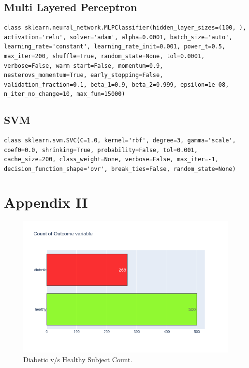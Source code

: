 \documentclass[12pt]{article}
\begin{document}
\newpage
\subsection{Multi Layered Perceptron}
\begin{lstlisting}
class sklearn.neural_network.MLPClassifier(hidden_layer_sizes=(100, ), activation='relu', solver='adam', alpha=0.0001, batch_size='auto', learning_rate='constant', learning_rate_init=0.001, power_t=0.5, max_iter=200, shuffle=True, random_state=None, tol=0.0001, verbose=False, warm_start=False, momentum=0.9, nesterovs_momentum=True, early_stopping=False, validation_fraction=0.1, beta_1=0.9, beta_2=0.999, epsilon=1e-08, n_iter_no_change=10, max_fun=15000)
\end{lstlisting}

\subsection{SVM}
\begin{lstlisting}
class sklearn.svm.SVC(C=1.0, kernel='rbf', degree=3, gamma='scale', coef0=0.0, shrinking=True, probability=False, tol=0.001, cache_size=200, class_weight=None, verbose=False, max_iter=-1, decision_function_shape='ovr', break_ties=False, random_state=None)
\end{lstlisting}
\clearpage

\section{Appendix II}

\begin{figure}[ht]
\centering
\includegraphics[width=1\textwidth]{1.png}
\caption{\label{fig:8} Diabetic v/s Healthy Subject Count.}
\end{figure}
\end{document}
